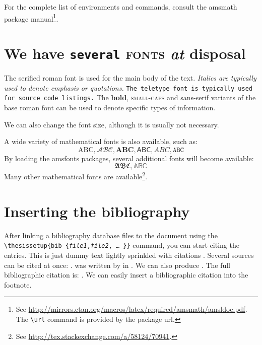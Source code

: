 \documentclass[
  digital,     %
  twoside,     %
  lof,         %
  lot,         %
]{fithesis4}
\begin{document}
For the complete list of environments and commands, consult the
\textsf{amsmath} package manual\footnote{
  See \url{http://mirrors.ctan.org/macros/latex/required/amsmath/amsldoc.pdf}.
  The \texttt{\textbackslash url} command is provided by the
  package \textsf{url}.
}.

\chapter{\textnormal{We \textsf{have} \texttt{several} \textsc{fonts}
  \textit{at} \textbf{disposal}}}
The serified roman font is used for the main body of the text.
\textit{Italics are typically used to denote emphasis or
quotations.} \texttt{The teletype font is typically used for source
code listings.} The \textbf{bold}, \textsc{small-caps} and
\textsf{sans-serif} variants of the base roman font can be used to
denote specific types of information.

\tiny We \scriptsize can \footnotesize also \small change \normalsize
the \large font \Large size, \LARGE although \huge it \Huge
is \huge usually \LARGE not \Large necessary.\normalsize

A wide variety of mathematical fonts is also available, such as: \[
  \mathrm{ABC}, \mathcal{ABC}, \mathbf{ABC}, \mathsf{ABC},
  \mathit{ABC}, \mathtt{ABC}
\] By loading the \textsf{amsfonts} packages, several additional
fonts will become available: \[
  \mathfrak{ABC}, \mathbb{ABC}
\] Many other mathematical fonts are available\footnote{
  See \url{http://tex.stackexchange.com/a/58124/70941}.
}.

\chapter{Inserting the bibliography}
After linking a bibliography data\-base files to the document using
the \verb"\"\texttt{thesis\discretionary{-}{}{}setup\{bib\discretionary{=}{=}{=}%
\{\textit{file1},\textit{file2},\,\ldots\,\}\}} command, you can
start citing the entries. This is just dummy text
\parencite{borgman03} lightly sprinkled with citations
\parencite[p.~123]{greenberg98}. Several sources can be cited at
once: \cite{borgman03,greenberg98,thanh01}.
 was written by \citeauthor{greenberg98} in
\citeyear{greenberg98}. We can also produce \textcite{greenberg98}%
. The full bibliographic citation is:
\emph{}. We can easily insert a bibliographic
citation into the footnote.
\end{document}

